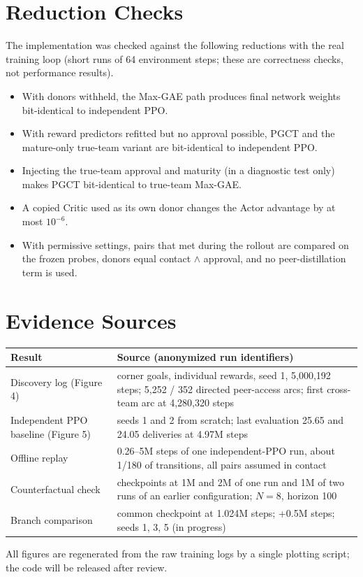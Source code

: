 \documentclass[10pt]{article}
\begin{document}
\section{Reduction Checks}
The implementation was checked against the following reductions with the real training loop (short runs of 64 environment steps; these are correctness checks, not performance results).
\begin{itemize}
\item With donors withheld, the Max-GAE path produces final network weights bit-identical to independent PPO.
\item With reward predictors refitted but no approval possible, PGCT and the mature-only true-team variant are bit-identical to independent PPO.
\item Injecting the true-team approval and maturity (in a diagnostic test only) makes PGCT bit-identical to true-team Max-GAE.
\item A copied Critic used as its own donor changes the Actor advantage by at most $10^{-6}$.
\item With permissive settings, pairs that met during the rollout are compared on the frozen probes, donors equal contact $\wedge$ approval, and no peer-distillation term is used.
\end{itemize}

\section{Evidence Sources}
\begin{table}[h]\centering\small
\begin{tabular}{p{.33\linewidth}p{.6\linewidth}}\toprule
Result & Source (anonymized run identifiers)\\\midrule
Discovery log (Figure 4) & corner goals, individual rewards, seed 1, 5{,}000{,}192 steps; 5{,}252 / 352 directed peer-access arcs; first cross-team arc at 4{,}280{,}320 steps\\
Independent PPO baseline (Figure 5) & seeds 1 and 2 from scratch; last evaluation 25.65 and 24.05 deliveries at 4.97M steps\\
Offline replay & 0.26--5M steps of one independent-PPO run, about 1/180 of transitions, all pairs assumed in contact\\
Counterfactual check & checkpoints at 1M and 2M of one run and 1M of two runs of an earlier configuration; $N=8$, horizon 100\\
Branch comparison & common checkpoint at 1.024M steps; +0.5M steps; seeds 1, 3, 5 (in progress)\\\bottomrule
\end{tabular}
\end{table}

All figures are regenerated from the raw training logs by a single plotting script; the code will be released after review.
\end{document}
